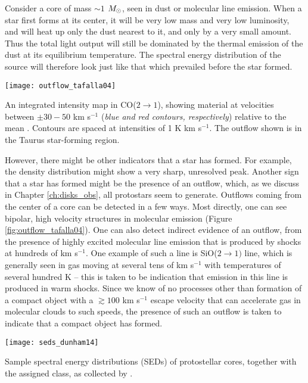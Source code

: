 Consider a core of mass $\sim 1$ $M_{\odot}$, seen in dust or molecular line emission. When a star first forms at its center, it will be very low mass and very low luminosity, and will heat up only the dust nearest to it, and only by a very small amount. Thus the total light output will still be dominated by the thermal emission of the dust at its equilibrium temperature. The spectral energy distribution of the source will therefore look just like that which prevailed before the star formed.

\begin{marginfigure}
\texttt{[image: outflow\_tafalla04]}
\caption[Outflow in CO($2\rightarrow 1$)]{
\label{fig:outflow_tafalla04}
An integrated intensity map in CO($2\rightarrow 1$), showing material at velocities between $\pm 30-50$ km s$^{-1}$ (\textit{blue and red contours, respectively}) relative to the mean \citep{tafalla04c}. Contours are spaced at intensities of 1 K km s$^{-1}$. The outflow shown is in the Taurus star-forming region.
}
\end{marginfigure}

However, there might be other indicators that a star has formed. For example, the density distribution might show a very sharp, unresolved peak. Another sign that a star has formed might be the presence of an outflow, which, as we discuss in Chapter \ref{ch:disks_obs}, all protostars seem to generate. Outflows coming from the center of a core can be detected in a few ways. Most directly, one can see bipolar, high velocity structures in molecular emission (Figure \ref{fig:outflow_tafalla04}). One can also detect indirect evidence of an outflow, from the presence of highly excited molecular line emission that is produced by shocks at hundreds of km s$^{-1}$. One example of such a line is SiO($2\rightarrow 1)$ line, which is generally seen in gas moving at several tens of km s$^{-1}$ with temperatures of several hundred K -- this is taken to be indication that emission in this line is produced in warm shocks. Since we know of no processes other than formation of a compact object with a $\gtrsim 100$ km s$^{-1}$ escape velocity that can accelerate gas in molecular clouds to such speeds, the presence of such an outflow is taken to indicate that a compact object has formed.

\begin{marginfigure}
\texttt{[image: seds\_dunham14]}
\caption[Sample SEDs of protostellar cores]{
\label{fig:seds_dunham14}
Sample spectral energy distributions (SEDs) of protostellar cores, together with the assigned class, as collected by \citet{dunham14a}.
}
\end{marginfigure}

